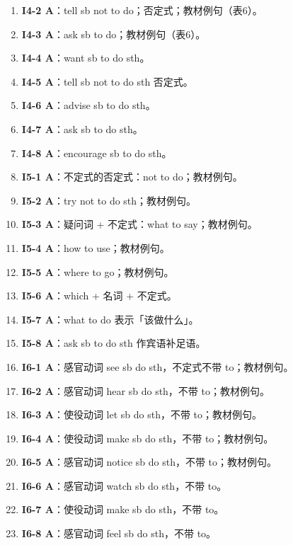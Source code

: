 \documentclass[11pt,a4paper]{ctexart}
\begin{document}
\begin{enumerate}[leftmargin=1.6em,itemsep=2pt]
\item \textbf{I4-2 A}：tell sb not to do；否定式；教材例句（表6）。
\item \textbf{I4-3 A}：ask sb to do；教材例句（表6）。
\item \textbf{I4-4 A}：want sb to do sth。
\item \textbf{I4-5 A}：tell sb not to do sth 否定式。
\item \textbf{I4-6 A}：advise sb to do sth。
\item \textbf{I4-7 A}：ask sb to do sth。
\item \textbf{I4-8 A}：encourage sb to do sth。
\item \textbf{I5-1 A}：不定式的否定式：not to do；教材例句。
\item \textbf{I5-2 A}：try not to do sth；教材例句。
\item \textbf{I5-3 A}：疑问词 + 不定式：what to say；教材例句。
\item \textbf{I5-4 A}：how to use；教材例句。
\item \textbf{I5-5 A}：where to go；教材例句。
\item \textbf{I5-6 A}：which + 名词 + 不定式。
\item \textbf{I5-7 A}：what to do 表示「该做什么」。
\item \textbf{I5-8 A}：ask sb to do sth 作宾语补足语。
\item \textbf{I6-1 A}：感官动词 see sb do sth，不定式不带 to；教材例句。
\item \textbf{I6-2 A}：感官动词 hear sb do sth，不带 to；教材例句。
\item \textbf{I6-3 A}：使役动词 let sb do sth，不带 to；教材例句。
\item \textbf{I6-4 A}：使役动词 make sb do sth，不带 to；教材例句。
\item \textbf{I6-5 A}：感官动词 notice sb do sth，不带 to；教材例句。
\item \textbf{I6-6 A}：感官动词 watch sb do sth，不带 to。
\item \textbf{I6-7 A}：使役动词 make sb do sth，不带 to。
\item \textbf{I6-8 A}：感官动词 feel sb do sth，不带 to。
\end{enumerate}
\end{document}
